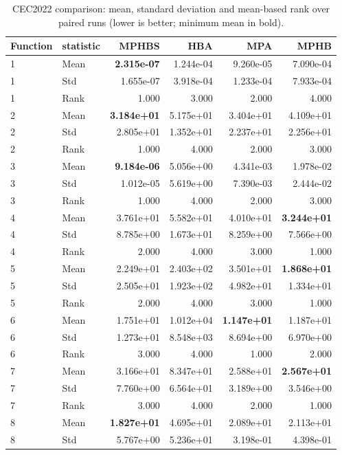 \begin{table}[t]
\centering
\scriptsize
\caption{CEC2022 comparison: mean, standard deviation and mean-based rank over paired runs (lower is better; minimum mean in bold).}
\label{tab:cec2022_comparison}
\begin{tabular}{llrrrr}
\hline
Function & statistic & MPHBS & HBA & MPA & MPHB \\
\hline
1 & Mean & \textbf{2.315e-07} & 1.244e-04 & 9.260e-05 & 7.090e-04 \\
1 & Std & 1.655e-07 & 3.918e-04 & 1.233e-04 & 7.933e-04 \\
1 & Rank & 1.000 & 3.000 & 2.000 & 4.000 \\
2 & Mean & \textbf{3.184e+01} & 5.175e+01 & 3.404e+01 & 4.109e+01 \\
2 & Std & 2.805e+01 & 1.352e+01 & 2.237e+01 & 2.256e+01 \\
2 & Rank & 1.000 & 4.000 & 2.000 & 3.000 \\
3 & Mean & \textbf{9.184e-06} & 5.056e+00 & 4.341e-03 & 1.978e-02 \\
3 & Std & 1.012e-05 & 5.619e+00 & 7.390e-03 & 2.444e-02 \\
3 & Rank & 1.000 & 4.000 & 2.000 & 3.000 \\
4 & Mean & 3.761e+01 & 5.582e+01 & 4.010e+01 & \textbf{3.244e+01} \\
4 & Std & 8.785e+00 & 1.673e+01 & 8.259e+00 & 7.566e+00 \\
4 & Rank & 2.000 & 4.000 & 3.000 & 1.000 \\
5 & Mean & 2.249e+01 & 2.403e+02 & 3.501e+01 & \textbf{1.868e+01} \\
5 & Std & 2.505e+01 & 1.923e+02 & 4.982e+01 & 1.334e+01 \\
5 & Rank & 2.000 & 4.000 & 3.000 & 1.000 \\
6 & Mean & 1.751e+01 & 1.012e+04 & \textbf{1.147e+01} & 1.187e+01 \\
6 & Std & 1.273e+01 & 8.548e+03 & 8.694e+00 & 6.970e+00 \\
6 & Rank & 3.000 & 4.000 & 1.000 & 2.000 \\
7 & Mean & 3.166e+01 & 8.347e+01 & 2.588e+01 & \textbf{2.567e+01} \\
7 & Std & 7.760e+00 & 6.564e+01 & 3.189e+00 & 3.546e+00 \\
7 & Rank & 3.000 & 4.000 & 2.000 & 1.000 \\
8 & Mean & \textbf{1.827e+01} & 4.695e+01 & 2.089e+01 & 2.113e+01 \\
8 & Std & 5.767e+00 & 5.236e+01 & 3.198e-01 & 4.398e-01 \\

\end{tabular}
\end{table}
